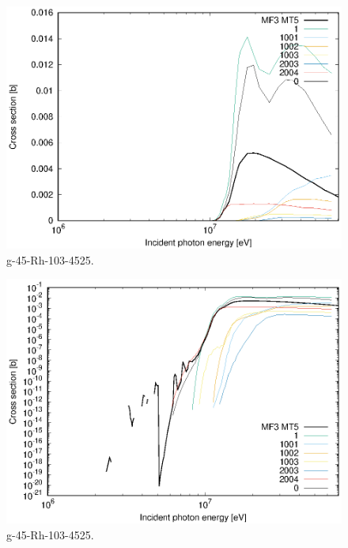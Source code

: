 \begin{figure}
 \includegraphics[width=\linewidth]{eps/g_45-Rh-103_4525.eps}
  \caption{g-45-Rh-103-4525.}
\end{figure}
\begin{figure}
 \includegraphics[width=\linewidth]{eps-log/g_45-Rh-103_4525.eps}
 \caption{g-45-Rh-103-4525.}
\end{figure}
\newpage \clearpage

